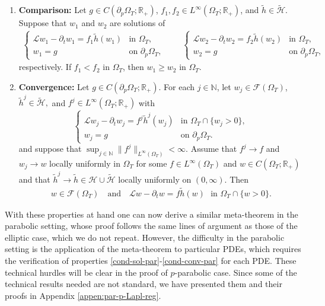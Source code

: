 \documentclass[11pt,oneside,english]{amsart}
\newcommand{\R}{{\mathbb R}}
\newcommand{\N}{{\mathbb N}}
\newcommand{\cL}{{\mathcal L}}
\newcommand{\cH}{{\mathcal H}}
\newcommand{\cF}{{\mathcal F}}
\numberwithin{equation}{section}
\theoremstyle{plain}
\numberwithin{equation}{section}
\begin{document}
\begin{enumerate}[label={\bf (PP\arabic*)}]
   
       
    

    \medskip

    \item\label{cond-comp-par} {\bf Comparison:} Let $g\in C(\partial_p\Omega_T;\R_+)$, $f_1,f_2\in L^\infty(\Omega_T;\R_+)$, and $\tilde h\in\widetilde{\mathcal H}$. Suppose that $w_1$ and $w_2$ are solutions of
    \begin{align*}
        \begin{cases}
            \cL w_1-\partial_tw_1=f_1\tilde h(w_1)&\text{in }\Omega_T,\\
            w_1=g&\text{on }\partial_p\Omega_T,
        \end{cases}\qquad
        \begin{cases}
            \cL w_2-\partial_tw_2=f_2\tilde h(w_2)&\text{in }\Omega_T,\\
            w_2=g&\text{on }\partial_p\Omega_T,
        \end{cases}
    \end{align*}
    respectively. 
   If $f_1<f_2$ in $\Omega_T$, then $w_1\ge w_2$ in $\Omega_T$.

   \medskip


    \item\label{cond-conv-par} {\bf Convergence:}
    Let $g\in C(\partial_p\Omega_T;\R_+)$. For each $j\in \N$, let $w_j\in \cF(\Omega_T)$, $\tilde h^j\in\widetilde{\mathcal H},$ and $f^j\in L^\infty(\Omega_T;\R_+)$ with
    $$
    \begin{cases}
        \cL w_j-\partial_tw_j=f^j\tilde h^j(w_j)&\text{in }\Omega_T\cap\{w_j>0\},\\
        w_j=g&\text{on }\partial_p\Omega_T.
    \end{cases}
    $$ 
  and suppose that $
\sup_{j\in\mathbb N}\|f^j\|_{L^\infty(\Omega_T)}<\infty.$ Assume that $f^j\to f$ and $w_j\to w$ locally uniformly in $\Omega_T$ for some $f\in L^\infty(\Omega_T)$ and $w\in C(\Omega_T;\R_+)$ and that $\tilde h^j\to \tilde h\in \cH\cup\widetilde\cH$ locally uniformly on $(0,\infty)$. Then
    \begin{align*}
            w\in \cF(\Omega_T)\quad\text{and}\quad  \cL w-\partial_t w=f\tilde h(w)\,\,\text{ in }\Omega_T\cap\{w>0\}.
    \end{align*}
\end{enumerate}

With these properties at hand one can now derive a similar meta-theorem in the parabolic setting, whose proof follows the same lines of argument as those of the elliptic case, which we do not repeat.
However, the difficulty  in the parabolic setting is the application of the meta-theorem to particular PDEs, which requires the verification of properties \ref{cond-sol-par}-\ref{cond-conv-par} for each PDE. 
These technical hurdles will be  clear in the proof of $p$-parabolic case. Since some of the technical results needed are not standard, we have presented them and their proofs in Appendix \ref{appen:par-p-Lapl-reg}.
\end{document}
